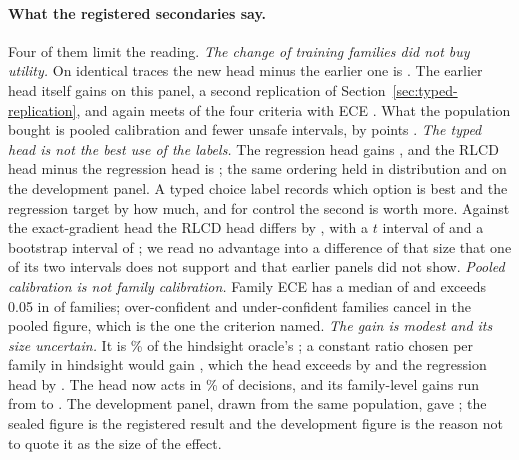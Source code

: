 \documentclass[10pt]{article}
\begin{document}
\paragraph{What the registered secondaries say.}
Four of them limit the reading. \emph{The change of training families did not buy utility.} On identical traces the new head minus the earlier one is \TypedPopVsReference{} \TypedPopVsReferenceT{}. The earlier head itself gains \TypedSealGain{} \TypedSealGainT{} on this panel, a second replication of Section~\ref{sec:typed-replication}, and again meets \TypedSealCriteriaMet{} of the four criteria with ECE \TypedSealEce{}. What the population bought is pooled calibration and fewer unsafe intervals, by \TypedPopVsReferenceUnsafe{} points \TypedPopVsReferenceUnsafeFamily{}. \emph{The typed head is not the best use of the labels.} The regression head gains \TypedPopRegressGain{} \TypedPopRegressGainT{}, and the RLCD head minus the regression head is \TypedPopRlcdVsRegress{} \TypedPopRlcdVsRegressT{}; the same ordering held in distribution and on the development panel. A typed choice label records which option is best and the regression target by how much, and for control the second is worth more. Against the exact-gradient head the RLCD head differs by \TypedPopRlcdVsAnalytic{}, with a $t$ interval of \TypedPopRlcdVsAnalyticT{} and a bootstrap interval of \TypedPopRlcdVsAnalyticFamily{}; we read no advantage into a difference of that size that one of its two intervals does not support and that earlier panels did not show. \emph{Pooled calibration is not family calibration.} Family ECE has a median of \TypedPopEceMedian{} and exceeds 0.05 in \TypedPopEceAbove{} of \TypedPopFamilies{} families; over-confident and under-confident families cancel in the pooled figure, which is the one the criterion named. \emph{The gain is modest and its size uncertain.} It is \TypedPopOracleShare\% of the hindsight oracle's \TypedPopOracleGain{}; a constant ratio chosen per family in hindsight would gain \TypedPopFamilyConstantGain{}, which the head exceeds by \TypedPopHeadVsFamilyConstant{} and the regression head by \TypedPopRegressVsFamilyConstant{}. The head now acts in \TypedPopOverride\% of decisions, and its family-level gains run from \TypedPopSmallest{} to \TypedPopLargest{}. The development panel, drawn from the same population, gave \TypedPopDevGain{}; the sealed figure is the registered result and the development figure is the reason not to quote it as the size of the effect.
\end{document}
